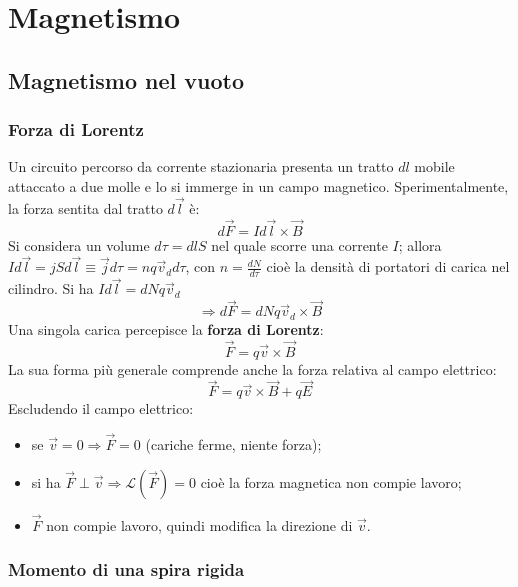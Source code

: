 \documentclass[10pt, a4paper]{scrartcl}
\numberwithin{equation}{subsection}
\theoremstyle{style1}
\begin{document}
\newpage

\section{Magnetismo}

\subsection{Magnetismo nel vuoto}

\subsubsection{Forza di Lorentz}


Un circuito percorso da corrente stazionaria presenta un tratto $dl$ mobile attaccato a due molle e lo si immerge in un campo magnetico. Sperimentalmente, la forza sentita dal tratto $d\vec{l}$ \`e:
\begin{equation}
	d\vec{F} = Id \vec{l}\times \vec{B}
\end{equation}
Si considera un volume $d\tau  = dl S$ nel quale scorre una corrente $I$; allora $I d\vec{l} = jS d\vec{l} \equiv \vec{j}d\tau = nq \vec{v}_d d\tau $, con $n=\frac{dN}{d\tau }$ cio\`e la densit\`a di portatori di carica nel cilindro. Si ha $Id\vec{l} = dN q\vec{v}_d$
\begin{equation}
	\Rightarrow d\vec{F} = dN q\vec{v}_d \times \vec{B}
\end{equation}
Una singola carica percepisce la \textbf{forza di Lorentz}:
\begin{equation}
	\vec{F} = q\vec{v}\times \vec{B}
\end{equation}
La sua forma pi\`u generale comprende anche la forza relativa al campo elettrico:
\begin{equation}
	\vec{F} = q\vec{v} \times \vec{B}  + q \vec{E}
\end{equation}
Escludendo il campo elettrico:
\begin{itemize}
	\item se $\vec{v}= 0 \Rightarrow \vec{F} = 0$ (cariche ferme, niente forza);
	\item si ha $\vec{F}\perp \vec{v}\Rightarrow \mathcal{L}(\vec{F}) = 0$ cio\`e la forza magnetica non compie lavoro;
	\item $\vec{F}$ non compie lavoro, quindi modifica la direzione di $\vec{v}$.
\end{itemize}
\subsubsection{Momento di una spira rigida}
\end{document}
